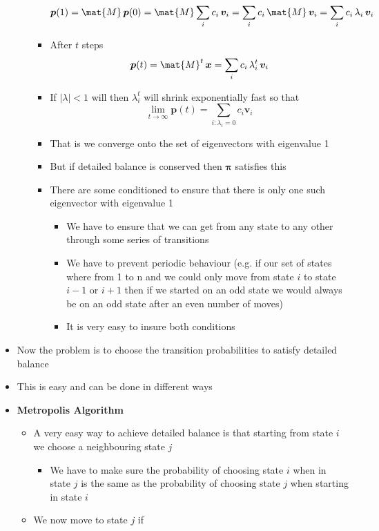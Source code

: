 \documentclass[11pt]{article}
\begin{document}
\begin{itemize}
\begin{itemize}
\begin{itemize}
$$ \bm{p}(1) = \mat{M} \, \bm{p}(0) = \mat{M} \sum_{i} c_{i}\,\bm{v}_{i} 
	 =  \sum_{i} c_{i}\,\mat{M}\,\bm{v}_{i} 
         =  \sum_{i} c_{i}\,\lambda_{i}\,\bm{v}_{i} $$
\item After \(t\) steps
$$ \bm{p}(t) = \mat{M}^{t} \, \bm{x} = \sum_{i}
         c_{i}\,\lambda_{i}^{t}\,\bm{v}_{i} $$
\item If \(|\lambda|<1\) will then \(\lambda_{i}^{t}\) will shrink
exponentially fast so that
$$ \lim_{t\rightarrow\infty} \bm{p}(t) =
         \sum_{i:\lambda_{i}=0} c_{i} \bm{v}_{i} $$
\item That is we converge onto the set of eigenvectors with
eigenvalue 1
\item But if detailed balance is conserved then \(\bm{\pi}\)
satisfies this
\item There are some conditioned to ensure that there is only one
such eigenvector with eigenvalue 1
\begin{itemize}
\item We have to ensure that we can get from any state to any
other through some series of transitions
\item We have to prevent periodic behaviour (e.g. if our set of
states where from 1 to n and we could only move from state
\(i\) to state \(i-1\) or \(i+1\) then if we started on an odd
state we would always be on an odd state after an even
number of moves)
\item It is very easy to insure both conditions
\end{itemize}
\end{itemize}
\end{itemize}
\item Now the problem is to choose the transition probabilities to
satisfy detailed balance
\item This is easy and can be done in different ways
\item \textbf{Metropolis Algorithm}
\begin{itemize}
\item A very easy way to achieve detailed balance is that starting
from state \(i\) we choose a neighbouring state \(j\)
\begin{itemize}
\item We have to make sure the probability of choosing state \(i\)
when in state \(j\) is the same as the probability of choosing
state \(j\) when starting in state \(i\)
\end{itemize}
\item We now move to state \(j\) if
\begin{itemize}

\end{itemize}
\end{itemize}
\end{itemize}
\end{document}
